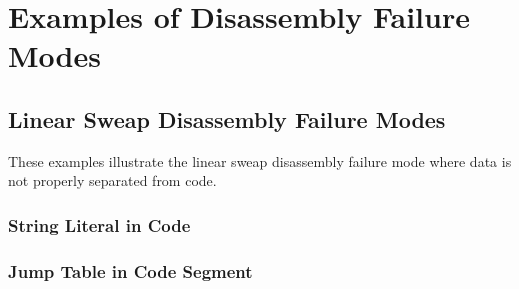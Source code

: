 

\chapter{Examples of Disassembly Failure Modes}
\label{app:examples_of_disassembly_failure_modes}



\section{Linear Sweap Disassembly Failure Modes}
\label{app:linear_sweap_disassembly_failure_modes}

These examples illustrate the linear sweap disassembly failure mode where data is not properly separated from code.



\subsection{String Literal in Code}






\subsection{Jump Table in Code Segment}

